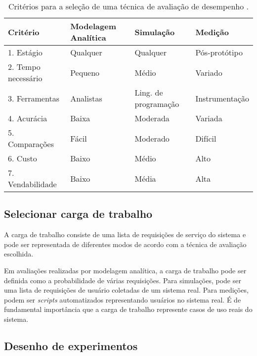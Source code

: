 \begin{table}
    \centering
    \begin{tabular}{llll}
        \toprule
        Critério            & Modelagem Analítica & Simulação            & Medição        \\
        \midrule
        1. Estágio          & Qualquer            & Qualquer             & Pós-protótipo  \\
        2. Tempo necessário & Pequeno             & Médio                & Variado        \\
        3. Ferramentas      & Analistas           & Ling. de programação & Instrumentação \\
        4. Acurácia         & Baixa               & Moderada             & Variada        \\
        5. Comparações      & Fácil               & Moderado             & Difícil        \\
        6. Custo            & Baixo               & Médio                & Alto           \\
        7. Vendabilidade    & Baixo               & Média                & Alta           \\
        \bottomrule
    \end{tabular}
    \caption{Critérios para a seleção de uma técnica de avaliação de desempenho \cite{jain1991art}.}
    \label{tab:analysistech}
\end{table}

\subsection{Selecionar carga de trabalho}

A carga de trabalho consiste de uma lista de requisições de serviço do sistema e pode ser representada de diferentes modos de acordo com a técnica de avaliação escolhida.

Em avaliações realizadas por modelagem analítica, a carga de trabalho pode ser definida como a probabilidade de várias requisições. Para simulações, pode ser uma lista de requisições de usuário coletadas de um sistema real. Para medições, podem ser \textit{scripts} automatizados representando usuários no sistema real. É de fundamental importância que a carga de trabalho represente casos de uso reais do sistema.

\subsection{Desenho de experimentos}

